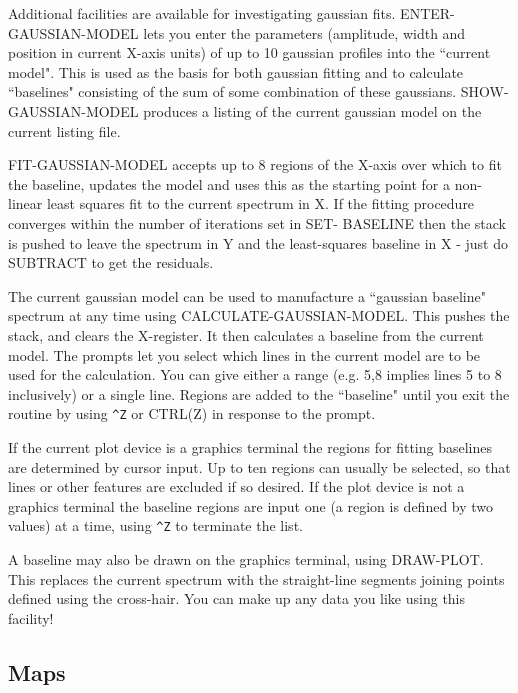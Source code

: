 \documentclass[11pt,twoside]{report}
\begin{document}
Additional facilities are available for investigating gaussian fits.
ENTER-GAUSSIAN-MODEL lets you enter the parameters (amplitude, width and
position in current X-axis units) of up to 10 gaussian profiles into the
``current model". This is used as the basis for both gaussian fitting and to
calculate ``baselines" consisting of the sum of some combination of these
gaussians. SHOW-GAUSSIAN-MODEL produces a listing of the current gaussian model
on the current listing file. 

FIT-GAUSSIAN-MODEL 
accepts up to 8 regions of the X-axis over which to fit
the baseline, updates the model and uses this as the starting point for a
non-linear least squares fit to the current spectrum in X. If the fitting
procedure converges within the number of iterations set in SET- BASELINE then
the stack is pushed to leave the spectrum in Y and the least-squares baseline
in X - just do SUBTRACT to get the residuals. 

The current gaussian model can be used to manufacture a ``gaussian baseline"
spectrum at any time using CALCULATE-GAUSSIAN-MODEL. This pushes the stack, and
clears the X-register. It then calculates a baseline from the current model.
The prompts let you select which lines in the current model are to be used for
the calculation. You can give either a range (e.g. 5,8 implies lines 5 to 8
inclusively) or a single line. Regions are added to the ``baseline" until you
exit the routine by using \verb+^Z+ or CTRL(Z)  in response to
the prompt. 

If the current plot device is a graphics terminal the regions for fitting
baselines are determined by cursor  input.
Up to ten regions can usually be selected, so that lines or other features are
excluded if so desired. If the plot device is not a graphics terminal the
baseline regions are input one (a region is defined by two values) at a time,
using \verb+^Z+ to terminate the list. 

A baseline may also be drawn on the graphics terminal, using DRAW-PLOT.
This replaces the current spectrum with the straight-line segments joining
points defined using the cross-hair. You can make up any data you like using
this facility!


\subsection{Maps} 
\end{document}
